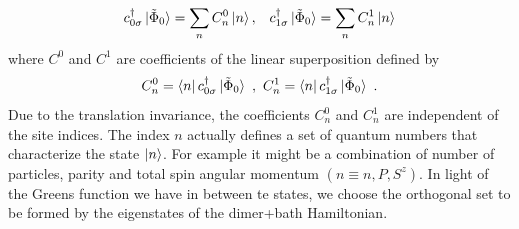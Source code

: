 \documentclass{report}
\numberwithin{equation}{section}
\begin{document}
\begin{equation}\begin{aligned}
	c^\dagger_{0\sigma}\ket{\tilde \Phi_0} = \sum_n C^0_n \ket{n}, && c^\dagger_{1\sigma}\ket{\tilde \Phi_0} = \sum_n C^1_n \ket{n}
\end{aligned}\end{equation}
where $C^{0}$ and $C^{1}$ are coefficients of the linear superposition defined by
\begin{equation}
C^{0}_{n} = \bra{n} c^\dagger_{0\sigma}\ket{\tilde \Phi_0}~,~ C^{1}_{n} = \bra{n} c^\dagger_{1\sigma}\ket{\tilde \Phi_0}~.
\end{equation}
Due to the translation invariance, the coefficients $C^{0}_{n}$ and $C^{1}_{n}$ are independent of the site indices. The index $n$ actually defines a set of quantum numbers that characterize the state $\ket{n}$. For example it might be a combination of number of particles, parity and total spin angular momentum $(n \equiv n, P, S^z)$. In light of the Greens function we have in between te states, we choose the orthogonal set to be formed by the eigenstates of the dimer+bath Hamiltonian.
\end{document}
